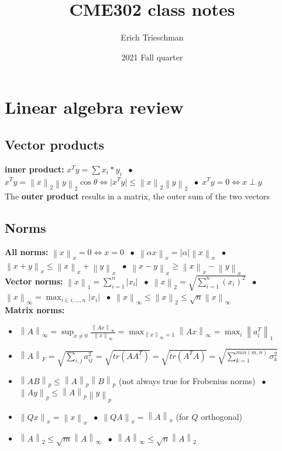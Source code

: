 \documentclass{article}
\title{CME302 class notes}
\author{Erich Trieschman}
\date{2021 Fall quarter}
\newcommand{\norm}[2]{\left\lVert#1\right\rVert_#2}
\newcommand{\abs}[1]{\lvert#1\rvert}
\newcommand*\bspace{$\; \bullet \;$}
\begin{document}
\section{Linear algebra review}

\subsection{Vector products}
\textbf{inner product: } $x^Ty = \sum x_i*y_i$ \bspace $x^Ty = \norm{x}{2}\norm{y}{2}\cos\theta \Longleftrightarrow \abs{x^Ty}\leq \norm{x}{2}\norm{y}{2}$ \bspace $x^Ty = 0 \Leftrightarrow x \perp y$\\
The \textbf{outer product} results in a matrix, the outer sum of the two vectors

\subsection{Norms}
\textbf{All norms: } $\norm{x}{x} = 0 \Leftrightarrow x = 0$ \bspace $\norm{\alpha x}{x} = \abs{\alpha}\norm{x}{x}$ \bspace $\norm{x+y}{x} \leq \norm{x}{x} + \norm{y}{x}$ \bspace $\norm{x-y}{x} \geq \norm{x}{x} - \norm{y}{x}$\\
\textbf{Vector norms:} $\norm{x}{1} = \sum_{i=1}^n \abs{x_i}$ \bspace $\norm{x}{2} = \sqrt{\sum_{i=1}^n (x_i)^2}$ \bspace $\norm{x}{\infty} = \max_{i \in i,\dots, n} \abs{x_i}$ \bspace $\norm{x}{\infty} \leq \norm{x}{2} \leq \sqrt{n}\norm{x}{\infty}$\\
\textbf{Matrix norms:}
\begin{itemize}
    \item $\norm{A}{\infty} = \sup_{x\neq 0}\frac{\norm{Ax}{\infty}}{\norm{x}{\infty}} = \max_{\norm{x}{\infty}=1}\norm{Ax}{\infty} = \max_i\norm{a_i^T}{1}$
    \item $\norm{A}{F} = \sqrt{\sum_{i,j} a_{ij}^2} = \sqrt{tr(AA^T)} = \sqrt{tr(A^TA)} = \sqrt{\sum_{k=1}^{min(m,n)}\sigma_k^2} $
    \item $\norm{AB}{p} \leq \norm{A}{p}\norm{B}{p}$ (not always true for Frobenius norms) \bspace $\norm{Ay}{p} \leq \norm{A}{p}\norm{y}{p}$
    \item $\norm{Qx}{x} = \norm{x}{x}$ \bspace $\norm{QA}{x} = \norm{A}{x}$ (for $Q$ orthogonal)
    \item $\norm{A}{2} \leq \sqrt{m}\norm{A}{\infty}$ \bspace $\norm{A}{\infty} \leq \sqrt{n}\norm{A}{2}$
\end{itemize}
\end{document}
